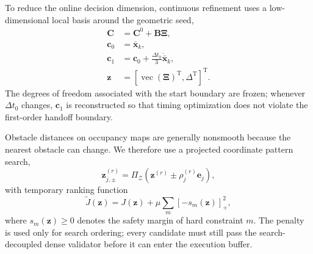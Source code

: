 \documentclass[journal,twoside]{IEEEtran}
\begin{document}
To reduce the online decision dimension, continuous refinement uses a low-dimensional local basis around the geometric seed,
\begin{equation}
\begin{aligned}
\mathbf C&=\mathbf C^0+\mathbf B\boldsymbol\Xi,\\
\mathbf c_0&=\bar{\mathbf x}_k,\\
\mathbf c_1&=\mathbf c_0+\frac{\Delta t_0}{3}\dot{\bar{\mathbf x}}_k,\\
\mathbf z&=[\operatorname{vec}(\boldsymbol\Xi)^{\mathrm T},\Delta^{\mathrm T}]^{\mathrm T}.
\end{aligned}
\label{eq:local_basis}
\end{equation}
The degrees of freedom associated with the start boundary are frozen; whenever $\Delta t_0$ changes, $\mathbf c_1$ is reconstructed so that timing optimization does not violate the first-order handoff boundary.

Obstacle distances on occupancy maps are generally nonsmooth because the nearest obstacle can change. We therefore use a projected coordinate pattern search,
\begin{equation}
\mathbf z_{j,\pm}^{(r)}=
\Pi_{\mathcal Z}\!\left(\mathbf z^{(r)}\pm\rho_j^{(r)}\mathbf e_j\right),
\label{eq:pattern_search}
\end{equation}
with temporary ranking function
\begin{equation}
\tilde J(\mathbf z)=J(\mathbf z)+
\mu\sum_m[-s_m(\mathbf z)]_+^2,
\label{eq:penalty_search}
\end{equation}
where $s_m(\mathbf z)\ge0$ denotes the safety margin of hard constraint $m$. The penalty is used only for search ordering; every candidate must still pass the search-decoupled dense validator before it can enter the execution buffer.
\end{document}
